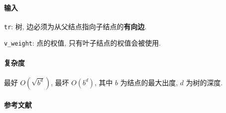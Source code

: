\paragraph{输入}

\verb|tr|: 树, 边必须为从父结点指向子结点的\textbf{有向边}.

\verb|v_weight|: 点的权值, 只有叶子结点的权值会被使用.

\paragraph{复杂度}

最好 \(O\left(\sqrt{b^d}\right)\), 最坏 \(O\left(b^d\right)\), 其中 \(b\) 为结点的最大出度, \(d\) 为树的深度.

\paragraph{参考文献}

\cite{enwiki:1188156145}
